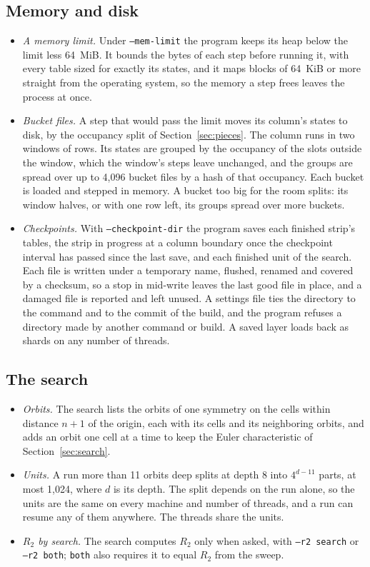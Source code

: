 \documentclass[11pt]{a000104}
\numberwithin{equation}{section}
\begin{document}
\subsection{Memory and disk}

\begin{itemize}
  \item \emph{A memory limit.} Under \texttt{--mem-limit} the program keeps its heap below the limit less 64~MiB. It bounds the bytes of each step before running it, with every table sized for exactly its states, and it maps blocks of 64~KiB or more straight from the operating system, so the memory a step frees leaves the process at once.
  \item \emph{Bucket files.} A step that would pass the limit moves its column's states to disk, by the occupancy split of Section~\ref{sec:pieces}. The column runs in two windows of rows. Its states are grouped by the occupancy of the slots outside the window, which the window's steps leave unchanged, and the groups are spread over up to 4{,}096 bucket files by a hash of that occupancy. Each bucket is loaded and stepped in memory. A bucket too big for the room splits: its window halves, or with one row left, its groups spread over more buckets.
  \item \emph{Checkpoints.} With \texttt{--checkpoint-dir} the program saves each finished strip's tables, the strip in progress at a column boundary once the checkpoint interval has passed since the last save, and each finished unit of the search. Each file is written under a temporary name, flushed, renamed and covered by a checksum, so a stop in mid-write leaves the last good file in place, and a damaged file is reported and left unused. A settings file ties the directory to the command and to the commit of the build, and the program refuses a directory made by another command or build. A saved layer loads back as shards on any number of threads.
\end{itemize}

\subsection{The search}

\begin{itemize}
  \item \emph{Orbits.} The search lists the orbits of one symmetry on the cells within distance $n + 1$ of the origin, each with its cells and its neighboring orbits, and adds an orbit one cell at a time to keep the Euler characteristic of Section~\ref{sec:search}.
  \item \emph{Units.} A run more than 11 orbits deep splits at depth 8 into $4^{d - 11}$ parts, at most 1{,}024, where $d$ is its depth. The split depends on the run alone, so the units are the same on every machine and number of threads, and a run can resume any of them anywhere. The threads share the units.
  \item \emph{$R_2$ by search.} The search computes $R_2$ only when asked, with \texttt{--r2 search} or \texttt{--r2 both}; \texttt{both} also requires it to equal $R_2$ from the sweep.
\end{itemize}
\end{document}
